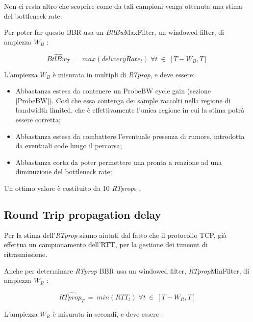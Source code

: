 Non ci resta altro che scoprire come da tali campioni venga ottenuta una stima del bottleneck rate. \bigskip

Per poter far questo BBR usa un \textit{BtlBw}MaxFilter, un windowed filter, di ampiezza $ W_{B} $ :

\[
	\widehat{\textit{BtlBw}_{T}} \: = \: max(deliveryRate_{t}) \; \forall t\: \in \: [T-W_{B},T]  
\]

L'ampiezza $ W_{B} $ è misurata in multipli di \textit{RTprop}, e deve essere:

\begin{itemize}

\item Abbastanza estesa da contenere un ProbeBW cycle gain (sezione \ref{ProbeBW}). Così che essa contenga dei sample raccolti nella regione di bandwidth limited, che è effettivamente l'unica regione in cui la stima potrà essere corretta;

\item Abbastanza estesa da combattere l'eventuale presenza di rumore, introdotta da eventuali code lungo il percorsa;

\item Abbastanza corta da poter permettere una pronta a reazione ad una diminuzione del bottleneck rate;

\end{itemize} 

Un ottimo valore è costituito da 10 \textit{RTprop}s \cite[p.~61]{Cardwell:2017:BCC:3042068.3009824}.

\subsection{Round Trip propagation delay}

Per la stima dell'\textit{RTprop} siamo aiutati dal fatto che il protocollo TCP, già effettua un campionamento dell'RTT, per la gestione dei timeout di ritrasmissione. \bigskip

Anche per determinare \textit{RTprop} BBR usa un windowed filter, \textit{RTprop}MinFilter, di ampiezza $ W_{R} $ :

\[
	\widehat{\textit{RTprop}_{T}} \: = \: min(RTT_{t}) \; \forall t\: \in \: [T-W_{R},T]  
\]

L'ampiezza $ W_{R} $ è misurata in secondi, e deve essere :

